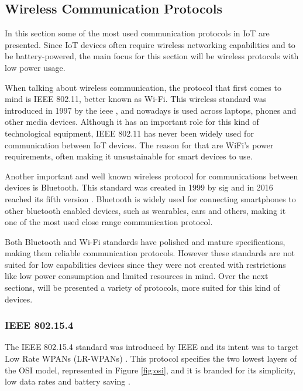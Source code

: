 \subsection{Wireless Communication Protocols}

In this section some of the most used communication protocols in IoT are presented. Since IoT devices often require wireless networking capabilities and to be battery-powered, the main focus for this section will be wireless protocols with low power usage.

When talking about wireless communication, the protocol that first comes to mind is IEEE 802.11, better known as Wi-Fi. This wireless standard was introduced in 1997 by the \acf{ieee} \cite{Bellis2017}, and nowadays is used across laptops, phones and other media devices. Although it has an important role for this kind of technological equipment, IEEE 802.11 has never been widely used for communication between IoT devices. The reason for that are WiFi’s power requirements, often making it unsustainable for smart devices to use.

Another important and well known wireless protocol for communications between devices is Bluetooth. This standard was created in 1999 by \acf{sig} and in 2016 reached its fifth version \cite{BluetoothSIG2016}. Bluetooth is widely used for connecting smartphones to other bluetooth enabled devices, such as wearables, cars and others, making it one of the most used close range communication protocol.

Both Bluetooth and Wi-Fi standards have polished and mature specifications, making them reliable communication protocols. However these standards are not suited for low capabilities devices since they were not created with restrictions like low power consumption and limited resources in mind. Over the next sections, will be presented a variety of protocols, more suited for this kind of devices.

\subsubsection{IEEE 802.15.4}

The IEEE 802.15.4 standard was introduced by IEEE and its intent was to target Low Rate WPANs (LR-WPANs) \cite{Kemp2010}. This protocol specifies the two lowest layers of the OSI model, represented in Figure \ref{fig:osi}, and it is branded for its simplicity, low data rates and battery saving \cite{Devadiga2003}.

